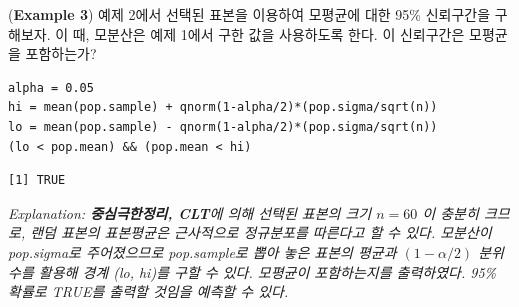 \documentclass{article}
\begin{document}
(\textbf{Example 3}) 예제 2에서 선택된 표본을 이용하여 모평균에 대한 95\% 신뢰구간을 구해보자. 이 때, 모분산은 예제 1에서 구한 값을 사용하도록 한다. 이 신뢰구간은 모평균을 포함하는가?
\begin{lstlisting}[style={r-style}]
alpha = 0.05
hi = mean(pop.sample) + qnorm(1-alpha/2)*(pop.sigma/sqrt(n))
lo = mean(pop.sample) - qnorm(1-alpha/2)*(pop.sigma/sqrt(n))
(lo < pop.mean) && (pop.mean < hi)
\end{lstlisting}
\begin{lstlisting}[style={out-style}]
[1] TRUE
\end{lstlisting}
\emph{Explanation: \textbf{중심극한정리, CLT}에 의해 선택된 표본의 크기 $n = 60$ 이 충분히 크므로, 랜덤 표본의 표본평균은 근사적으로 정규분포를 따른다고 할 수 있다. 모분산이 pop.sigma로 주어졌으므로 pop.sample로 뽑아 놓은 표본의 평균과 $(1-\alpha/2)$ 분위수를 활용해 경계 (lo, hi)를 구할 수 있다. 모평균이 포함하는지를 출력하였다. 95\% 확률로 TRUE를 출력할 것임을 예측할 수 있다.  } \\
\end{document}
